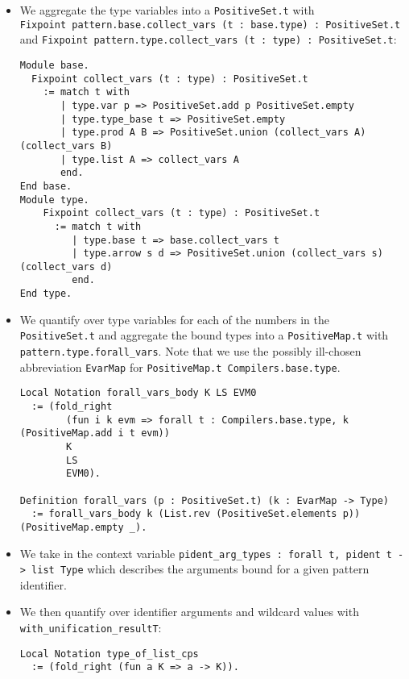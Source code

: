 \begin{itemize}
\begin{itemize}
    \begin{itemize}
    \item
      We aggregate the type variables into a \texttt{PositiveSet.t} with
      \texttt{Fixpoint\ pattern.base.collect\_vars\ (t\ :\ base.type)\ :\ PositiveSet.t}
      and
      \texttt{Fixpoint\ pattern.type.collect\_vars\ (t\ :\ type)\ :\ PositiveSet.t}:

\begin{verbatim}
Module base.
  Fixpoint collect_vars (t : type) : PositiveSet.t
    := match t with
       | type.var p => PositiveSet.add p PositiveSet.empty
       | type.type_base t => PositiveSet.empty
       | type.prod A B => PositiveSet.union (collect_vars A) (collect_vars B)
       | type.list A => collect_vars A
       end.
End base.
Module type.
    Fixpoint collect_vars (t : type) : PositiveSet.t
      := match t with
         | type.base t => base.collect_vars t
         | type.arrow s d => PositiveSet.union (collect_vars s) (collect_vars d)
         end.
End type.
\end{verbatim}
    \item
      We quantify over type variables for each of the numbers in the
      \texttt{PositiveSet.t} and aggregate the bound types into a
      \texttt{PositiveMap.t} with \texttt{pattern.type.forall\_vars}.
      Note that we use the possibly ill-chosen abbreviation
      \texttt{EvarMap} for \texttt{PositiveMap.t\ Compilers.base.type}.

\begin{verbatim}
Local Notation forall_vars_body K LS EVM0
  := (fold_right
        (fun i k evm => forall t : Compilers.base.type, k (PositiveMap.add i t evm))
        K
        LS
        EVM0).

Definition forall_vars (p : PositiveSet.t) (k : EvarMap -> Type)
  := forall_vars_body k (List.rev (PositiveSet.elements p)) (PositiveMap.empty _).
\end{verbatim}
    \item
      We take in the context variable
      \texttt{pident\_arg\_types\ :\ forall\ t,\ pident\ t\ -\textgreater{}\ list\ Type}
      which describes the arguments bound for a given pattern
      identifier.
    \item
      We then quantify over identifier arguments and wildcard values
      with \texttt{with\_unification\_resultT}:

\begin{verbatim}
Local Notation type_of_list_cps
  := (fold_right (fun a K => a -> K)).


\end{verbatim}
\end{itemize}
\end{itemize}
\end{itemize}
